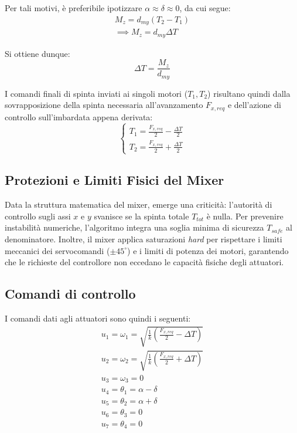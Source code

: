 Per tali motivi, è preferibile ipotizzare $\alpha \approx \delta \approx 0$, da cui segue:
\begin{equation}
    \begin{matrix}
        M_z = d_{my} (T_2 - T_1)\\
        \implies M_z = d_{my} \Delta T
    \end{matrix}
\end{equation}

Si ottiene dunque:
\begin{equation}
    \Delta T = \frac{M_z}{d_{my}}
\end{equation}

I comandi finali di spinta inviati ai singoli motori ($T_1, T_2$) risultano quindi dalla sovrapposizione della spinta necessaria all'avanzamento $F_{x,req}$ e dell'azione di controllo sull'imbardata appena derivata:
\begin{equation}
    \begin{cases}
        T_{1} = \frac{F_{x,req}}{2} - \frac{\Delta T}{2} \\
        T_{2} = \frac{F_{x,req}}{2} + \frac{\Delta T}{2}
    \end{cases}
\end{equation}


\subsection{Protezioni e Limiti Fisici del Mixer}
Data la struttura matematica del mixer, emerge una criticità: l'autorità di controllo sugli assi $x$ e $y$ svanisce se la spinta totale $T_{tot}$ è nulla. Per prevenire instabilità numeriche, l'algoritmo integra una soglia minima di sicurezza $T_{safe}$ al denominatore. Inoltre, il mixer applica saturazioni \textit{hard} per rispettare i limiti meccanici dei servocomandi ($\pm 45^\circ$) e i limiti di potenza dei motori, garantendo che le richieste del controllore non eccedano le capacità fisiche degli attuatori.

\subsection{Comandi di controllo}
I comandi dati agli attuatori sono quindi i seguenti:
\begin{gather}
    u_1 = \omega_1 = \sqrt{\frac{1}{k} \left(\frac{F_{x,req}}{2} - \Delta T \right)}\\
    u_2 = \omega_2 = \sqrt{\frac{1}{k} \left(\frac{F_{x,req}}{2} + \Delta T \right)}\\
    u_3 = \omega_3 = 0\\
    u_4 = \theta_1 = \alpha - \delta\\
    u_5 = \theta_2 = \alpha + \delta\\
    u_6 = \theta_3 = 0\\
    u_7 = \theta_4 = 0
\end{gather}

